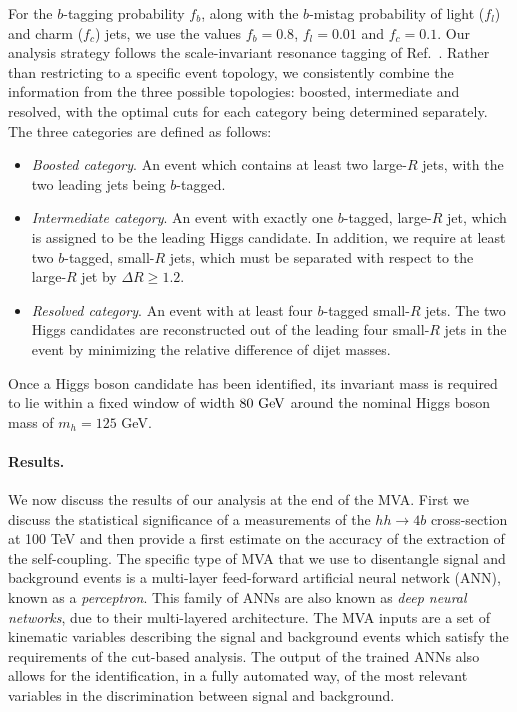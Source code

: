 \documentclass[a4paper,11pt]{article}
\begin{document}
For the $b$-tagging probability $f_b$, along with
the $b$-mistag probability of light ($f_l$) and charm ($f_c$) jets,
we use the values $f_b=0.8$, $f_l=0.01$
and  $f_c=0.1$.
Our analysis strategy follows the
scale-invariant resonance tagging of Ref.~\cite{Gouzevitch:2013qca}.
%
Rather than restricting to a specific event topology,
we consistently combine the information from
the three possible topologies: boosted, intermediate and
resolved, with the optimal cuts for each category being determined
separately.
%
The three categories are defined as follows:
\begin{itemize}
\item {\it Boosted category}. An event which
  contains at least two large-$R$ jets, with the two leading jets
 being $b$-tagged.
\item {\it Intermediate category}. An event with exactly one  $b$-tagged, large-$R$ jet, which
  is assigned to be the leading Higgs candidate.
  In addition, we require at least two $b$-tagged, small-$R$ jets,
  which must be separated with respect to the large-$R$ jet
  by  $\Delta R\ge 1.2$.
    
\item {\it Resolved category}. An event with at least
  four $b$-tagged small-$R$ jets.
  The two Higgs candidates are reconstructed out of the
  leading four small-$R$ jets in the event by minimizing the relative difference of
  dijet masses.
  
\end{itemize}
Once a Higgs boson candidate has been identified,
its invariant mass is required to lie within a fixed window
of width $80~{\rm GeV}$ around the nominal Higgs boson mass of $m_h= 125$
GeV.
%

\paragraph{Results.} We now discuss the results of our analysis
at the end of the MVA.
%
First we discuss the statistical significance of a measurements
of the $hh\to 4b$ cross-section at 100 TeV and then provide
a first estimate on the accuracy of the extraction of the self-coupling.
%
The specific type of  MVA that we use to
disentangle signal and background events is
a multi-layer feed-forward artificial neural network (ANN),
known as a {\it perceptron}.
%
This family of ANNs are also known as {\it deep neural networks},
due to their multi-layered architecture.
%
The MVA inputs are a set of kinematic variables describing the
signal and background
events which satisfy the requirements of the
cut-based analysis.
%
The output of the trained ANNs also allows for the identification,
in a fully automated way,
of the most relevant variables in the discrimination between 
signal and background.
\end{document}
